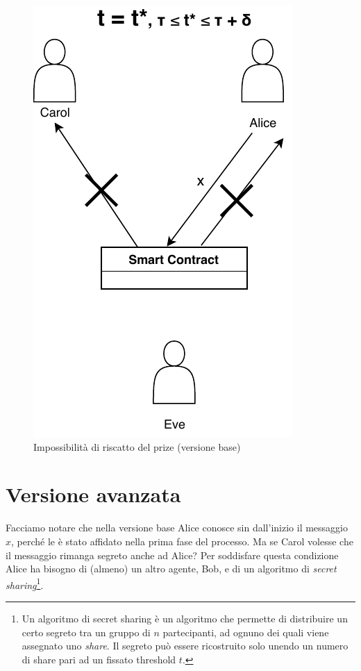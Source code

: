 \begin{figure}[H]
\begin{minipage}{0.4\textwidth}
		\includegraphics[width=.7\linewidth]{images/chap_protocollo/base-leak-2.pdf}
		\caption{Impossibilità di riscatto del prize (versione base)}
	\end{minipage}
\end{figure}

\section{Versione avanzata}
Facciamo notare che nella versione base
Alice conosce sin
dall'inizio il messaggio
$ x $, perché le è stato affidato nella prima fase del processo.
Ma se Carol volesse che il messaggio rimanga segreto anche ad Alice?
Per soddisfare questa condizione Alice ha bisogno di (almeno) un altro agente,
Bob, e di un
algoritmo di \textit{secret sharing}\footnote{Un algoritmo di secret sharing
	è un algoritmo che permette di
	distribuire un certo segreto tra un gruppo di $ n $ partecipanti, ad ognuno dei quali viene
	assegnato uno \textit{share}. Il segreto può essere ricostruito solo unendo un numero di share
	pari ad un fissato threshold $ t $.}.

